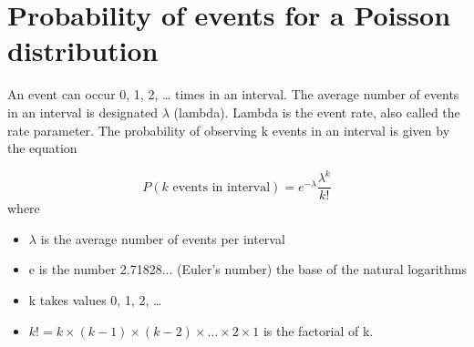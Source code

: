 \documentclass[12pt, a4paper]{report}
\theoremstyle{definition}
\theoremstyle{remark}
\begin{document}
\section*{Probability of events for a Poisson distribution}
An event can occur 0, 1, 2, … times in an interval. The average number of events in an interval is designated ${\displaystyle \lambda }$   (lambda). Lambda is the event rate, also called the rate parameter. The probability of observing k events in an interval is given by the equation

\[{\displaystyle P(k{\text{ events in interval}})=e^{-\lambda }{\frac {\lambda ^{k}}{k!}}} \]
where

\begin{itemize}
	\item ${\displaystyle \lambda }$  is the average number of events per interval
	\item	e is the number 2.71828... (Euler's number) the base of the natural logarithms
	\item	k takes values 0, 1, 2, …
	\item	$k! = k \times (k − 1) \times (k − 2) \times \ldots \times 2 \times 1$ is the factorial of k.
\end{itemize}
\end{document}
